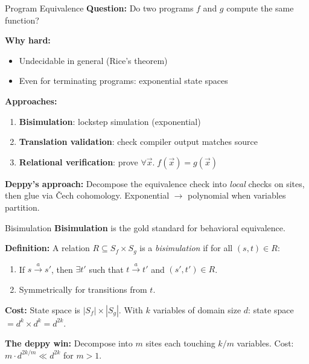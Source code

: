 \documentclass[aspectratio=169,10pt]{beamer}
\begin{document}
\begin{frame}{Program Equivalence}
\textbf{Question:} Do two programs $f$ and $g$ compute the same function?

\vspace{0.3em}
\textbf{Why hard:}
\begin{itemize}
  \item Undecidable in general (Rice's theorem)
  \item Even for terminating programs: exponential state spaces
\end{itemize}

\textbf{Approaches:}
\begin{enumerate}
  \item \textbf{Bisimulation}: lockstep simulation (exponential)
  \item \textbf{Translation validation}: check compiler output matches source
  \item \textbf{Relational verification}: prove $\forall \vec{x}.\; f(\vec{x}) = g(\vec{x})$
\end{enumerate}

\vspace{0.3em}
\textbf{Deppy's approach:} Decompose the equivalence check into \emph{local} checks on sites, then glue via \v{C}ech cohomology. Exponential $\to$ polynomial when variables partition.
\end{frame}

\begin{frame}{Bisimulation}
\textbf{Bisimulation} is the gold standard for behavioral equivalence.

\vspace{0.3em}
\textbf{Definition:} A relation $R \subseteq S_f \times S_g$ is a \emph{bisimulation} if for all $(s, t) \in R$:
\begin{enumerate}
  \item If $s \xrightarrow{a} s'$, then $\exists t'$ such that $t \xrightarrow{a} t'$ and $(s', t') \in R$.
  \item Symmetrically for transitions from $t$.
\end{enumerate}

\vspace{0.3em}
\textbf{Cost:} State space is $|S_f| \times |S_g|$.
With $k$ variables of domain size $d$: state space $= d^k \times d^k = d^{2k}$.

\vspace{0.3em}
\textbf{The deppy win:} Decompose into $m$ sites each touching $k/m$ variables.
Cost: $m \cdot d^{2k/m} \ll d^{2k}$ for $m > 1$.
\end{frame}
\end{document}
